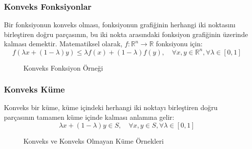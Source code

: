 \subsubsection{Konveks Fonksiyonlar}
Bir fonksiyonun konveks olması, fonksiyonun grafiğinin herhangi iki noktasını birleştiren doğru parçasının, bu iki nokta arasındaki fonksiyon grafiğinin üzerinde kalması demektir. Matematiksel olarak, $f: \mathbb{R}^n \rightarrow \mathbb{R}$ fonksiyonu için:
\begin{equation}
f(\lambda x + (1-\lambda)y) \leq \lambda f(x) + (1-\lambda) f(y), \quad \forall x,y \in \mathbb{R}^n, \forall \lambda \in [0,1]
\end{equation}

\begin{figure}[H]
    \centering
    \caption{Konveks Fonksiyon Örneği}
    \label{fig:convex_function}
\end{figure}

\subsubsection{Konveks Küme}
Konveks bir küme, küme içindeki herhangi iki noktayı birleştiren doğru parçasının tamamen küme içinde kalması anlamına gelir:
\begin{equation}
\lambda x + (1-\lambda)y \in S, \quad \forall x,y \in S, \forall \lambda \in [0,1]
\end{equation}

\begin{figure}[H]
    \centering
    \caption{Konveks ve Konveks Olmayan Küme Örnekleri}
    \label{fig:convex_nonconvex_sets}
\end{figure}

